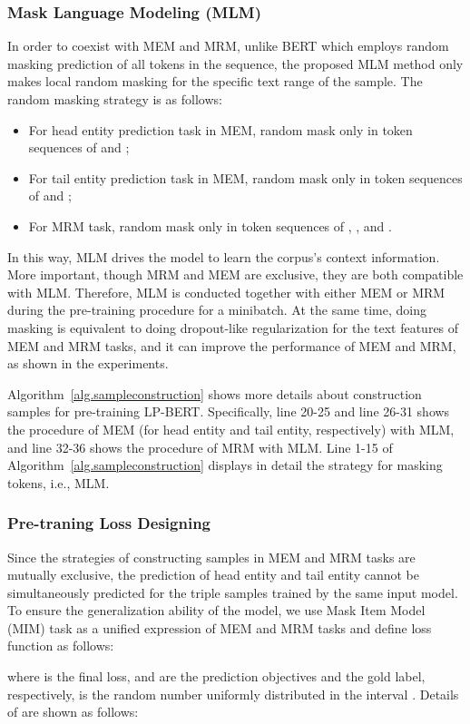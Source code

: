 \documentclass[journal]{IEEEtran}
\begin{document}
\subsubsection{Mask Language Modeling (MLM)}
In order to coexist with MEM and MRM, unlike BERT which employs \cite{devlin2018bert} random masking prediction of all tokens in the sequence, the proposed MLM method only makes local random masking for the specific text range of the sample. The random masking strategy is as follows:
\begin{itemize}
	\item For head entity prediction task in MEM, random mask only in token sequences of  and ;
	\item For tail entity prediction task in MEM, random mask only in token sequences of  and ;
	\item For MRM task, random mask only in token sequences of , ,  and .
\end{itemize}
In this way, MLM drives the model to learn the corpus's context information. More important, though MRM and MEM are exclusive, they are both compatible with MLM. Therefore, MLM is conducted together with either MEM or MRM during the pre-training procedure for a minibatch. At the same time, doing masking is equivalent to doing dropout-like regularization for the text features of MEM and MRM tasks, and it can improve the performance of MEM and MRM, as shown in the experiments.

Algorithm~\ref{alg.sampleconstruction} shows more details about construction samples for pre-training LP-BERT. Specifically, line 20-25 and line 26-31 shows the procedure of MEM (for head entity and tail entity, respectively) with MLM, and line 32-36 shows the procedure of MRM with MLM. Line 1-15 of Algorithm~\ref{alg.sampleconstruction}  displays in detail the strategy for masking tokens, i.e., MLM.

\subsubsection{Pre-traning Loss Designing}
Since the strategies of constructing samples in MEM and MRM tasks are mutually exclusive, the prediction of head entity and tail entity cannot be simultaneously predicted for the triple samples trained by the same input model. To ensure the generalization ability of the model, we use Mask Item Model (MIM) task as a unified expression of MEM and MRM tasks and define loss function as follows:

where  is the final loss,  and  are the prediction objectives and the gold label, respectively,  is the random number uniformly distributed in the interval . Details of  are shown as follows:
\end{document}

